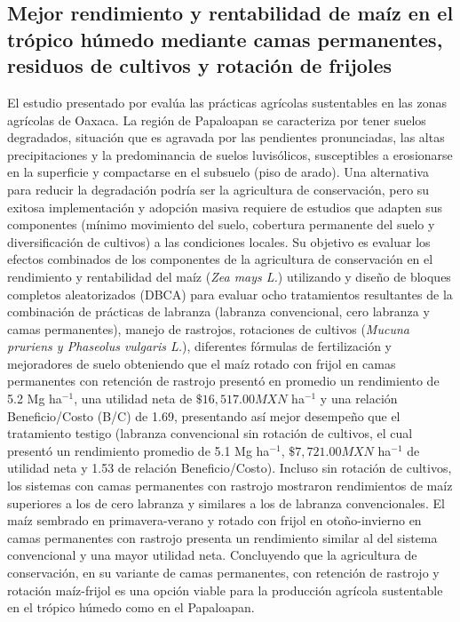 \subsection{Mejor rendimiento y rentabilidad de maíz en el trópico húmedo mediante camas permanentes, residuos de cultivos y rotación de frijoles}

El estudio presentado por \cite{guera2025mejor} evalúa las prácticas agrícolas sustentables en las zonas agrícolas de Oaxaca. La región de Papaloapan se caracteriza por tener suelos degradados, situación que es agravada por las pendientes pronunciadas, las altas precipitaciones y la predominancia de suelos luvisólicos, susceptibles a erosionarse en la superficie y compactarse en el subsuelo (piso de arado). Una alternativa para reducir la degradación podría ser la agricultura de conservación, pero su exitosa implementación y adopción masiva requiere de estudios que adapten sus componentes (mínimo movimiento del suelo, cobertura permanente del suelo y diversificación de cultivos) a las condiciones locales. Su objetivo es evaluar los efectos combinados de los componentes de la agricultura de conservación en el rendimiento y rentabilidad del maíz (\textsl{Zea mays L.}) utilizando y diseño de bloques completos aleatorizados (DBCA) para evaluar ocho tratamientos resultantes de la combinación de prácticas de labranza (labranza convencional, cero labranza y camas permanentes), manejo de rastrojos, rotaciones de cultivos (\textsl{Mucuna pruriens y Phaseolus vulgaris L.}), diferentes fórmulas de fertilización y mejoradores de suelo obteniendo que el maíz rotado con frijol en camas permanentes con retención de rastrojo presentó en promedio un rendimiento de 5.2 Mg ha$^{-1}$, una utilidad neta de $\$16,517.00 MXN$ ha$^{-1}$ y una relación Beneficio/Costo (B/C) de 1.69, presentando así mejor desempeño que el tratamiento testigo (labranza convencional sin rotación de cultivos, el cual presentó un rendimiento promedio de 5.1 Mg ha$^{-1}$, $\$7,721.00 MXN$ ha$^{-1}$ de utilidad neta y 1.53 de relación Beneficio/Costo). Incluso sin rotación de cultivos, los sistemas con camas permanentes con rastrojo mostraron rendimientos de maíz superiores a los de cero labranza y similares a los de labranza convencionales. El maíz sembrado en primavera-verano y rotado con frijol en otoño-invierno en camas permanentes con rastrojo presenta un rendimiento similar al del sistema convencional y una mayor utilidad neta. Concluyendo que la agricultura de conservación, en su variante de camas permanentes, con retención de rastrojo y rotación maíz-frijol es una opción viable para la producción agrícola sustentable en el trópico húmedo como en el Papaloapan.

